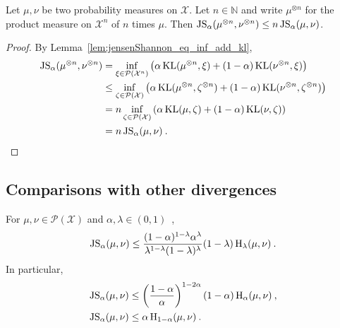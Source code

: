 \begin{lemma}
  \label{lem:jensenShannon_prod_n}
  Let $\mu, \nu$ be two probability measures on $\mathcal X$. Let $n \in \mathbb{N}$ and write $\mu^{\otimes n}$ for the product measure on $\mathcal X^n$ of $n$ times $\mu$.
  Then $\operatorname{JS}_\alpha(\mu^{\otimes n}, \nu^{\otimes n}) \le n \operatorname{JS}_\alpha(\mu, \nu)$.
\end{lemma}

\begin{proof}%
{}
By Lemma~\ref{lem:jensenShannon_eq_inf_add_kl},
\begin{align*}
\operatorname{JS}_\alpha(\mu^{\otimes n}, \nu^{\otimes n})
&= \inf_{\xi \in \mathcal P(\mathcal X^n)}\left( \alpha \operatorname{KL}(\mu^{\otimes n}, \xi) + (1 - \alpha)\operatorname{KL}(\nu^{\otimes n}, \xi) \right)
\\
&\le \inf_{\zeta \in \mathcal P(\mathcal X)}\left( \alpha \operatorname{KL}(\mu^{\otimes n}, \zeta^{\otimes n}) + (1 - \alpha)\operatorname{KL}(\nu^{\otimes n}, \zeta^{\otimes n}) \right)
\\
&= n \inf_{\zeta \in \mathcal P(\mathcal X)}\left( \alpha \operatorname{KL}(\mu, \zeta) + (1 - \alpha)\operatorname{KL}(\nu, \zeta) \right)
\\
&= n \operatorname{JS}_\alpha(\mu, \nu)
\: .
\end{align*}

\end{proof}



\subsection{Comparisons with other divergences}

\begin{lemma}
  \label{lem:jensenShannon_le_hellingerAlpha}
  For $\mu, \nu \in \mathcal P(\mathcal X)$ and $\alpha, \lambda \in (0,1)$~,
  \begin{align*}
  \operatorname{JS}_\alpha(\mu, \nu) \le \frac{(1 - \alpha)^{1 - \lambda} \alpha^\lambda}{\lambda^{1 - \lambda} (1 - \lambda)^\lambda} (1 - \lambda)\operatorname{H}_\lambda(\mu, \nu) \: .
  \end{align*}
  In particular,
  \begin{align*}
  \operatorname{JS}_\alpha(\mu, \nu)
  &\le \left(\frac{1 - \alpha}{\alpha}\right)^{1 - 2 \alpha} (1 - \alpha)\operatorname{H}_\alpha(\mu, \nu)
  \: , \\
  \operatorname{JS}_\alpha(\mu, \nu)
  &\le \alpha \operatorname{H}_{1 - \alpha}(\mu, \nu)
  \: .
  \end{align*}
\end{lemma}

